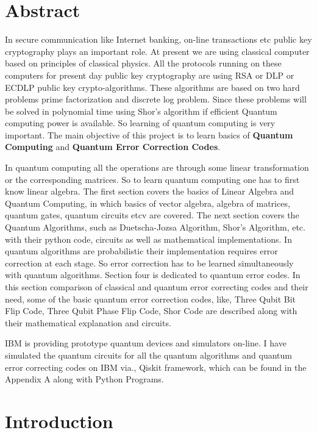 \documentclass[12pt]{report}
\begin{document}
\chapter*{Abstract}
 In secure communication like Internet banking, on-line transactions etc public key cryptography plays an important role. At present we are using classical computer based on principles of classical physics. All the protocols running on these computers for present day public key cryptography are using RSA  or DLP or ECDLP public key crypto-algorithms. These algorithms are based on two hard problems prime factorization and discrete log problem. Since these problems will  be solved in polynomial time using Shor's algorithm if efficient Quantum computing power is available. So learning of quantum computing is very important. The main objective of this project is to learn basics of \textbf{Quantum Computing} and \textbf{Quantum Error Correction Codes}.
 

In quantum computing all the operations are through some linear transformation or the corresponding matrices. So to learn quantum computing one has to first know linear algebra. The first section covers the basics of Linear Algebra and Quantum Computing, in which basics of vector algebra, algebra of matrices, quantum gates, quantum circuits etcv are covered. The next section covers the Quantum Algorithms, such as Duetscha-Jozsa Algorithm, Shor's Algorithm, etc. with their python code, circuits as well as mathematical implementations.  
In quantum algorithms are probabilistic their implementation requires error correction at each stage. So error correction has to be learned simultaneously with quantum algorithms. Section four is dedicated to quantum error codes. In this section comparison of classical and quantum error correcting codes and their need, some of the basic quantum error correction codes, like, Three Qubit Bit Flip Code, Three Qubit Phase Flip Code, Shor Code are described along with their mathematical explanation and circuits. 

IBM is providing prototype quantum devices and simulators on-line. I have simulated the quantum circuits for all the quantum algorithms and quantum error correcting codes on IBM  via., Qiskit framework, which can be found in the Appendix A along with Python Programs.
\tableofcontents
\listoffigures
\listoftables
\newpage
\chapter{Introduction}
\end{document}
